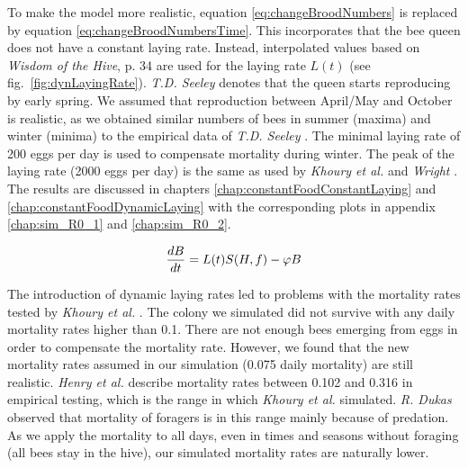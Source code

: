 		To make the model more realistic, equation \ref{eq:changeBroodNumbers} is replaced by equation \ref{eq:changeBroodNumbersTime}. This incorporates that the bee queen does not have a constant laying rate. Instead, interpolated values based on \textit{Wisdom of the Hive}, p. 34 \cite{seeley95} are used for the laying rate $L(t)$ (see fig.~\ref{fig:dynLayingRate}). \textit{T.D. Seeley} denotes that the queen starts reproducing by early spring. We assumed that reproduction between April/May and October is realistic, as we obtained similar numbers of bees in summer (maxima) and winter (minima) to the empirical data of \textit{T.D. Seeley} \cite{seeley95}. The minimal laying rate of 200 eggs per day is used to compensate mortality during winter. The peak of the laying rate (2000 eggs per day) is the same as used by \textit{Khoury et al.} \cite{khoury13} and \textit{Wright} \cite{wright08}. The results are discussed in chapters \ref{chap:constantFoodConstantLaying} and \ref{chap:constantFoodDynamicLaying} with the corresponding plots in appendix \ref{chap:sim_R0_1} and \ref{chap:sim_R0_2}.
		
		\begin{equation}\label{eq:changeBroodNumbersTime}
			{dB \over dt} = L(t)S(H,f)-\phi B
		\end{equation}
		
		The introduction of dynamic laying rates led to problems with the mortality rates tested by \textit{Khoury et al.} \cite{khoury13}. The colony we simulated did not survive with any daily mortality rates higher than 0.1. There are not enough bees emerging from eggs in order to compensate the mortality rate. However, we found that the new mortality rates assumed in our simulation (0.075 daily mortality) are still realistic. \textit{Henry et al.} \cite{henry12} describe mortality rates between 0.102 and 0.316 in empirical testing, which is the range in which \textit{Khoury et al.} \cite{khoury13} simulated. \textit{R. Dukas} \cite{dukas08} observed that mortality of foragers is in this range mainly because of predation. As we apply the mortality to all days, even in times and seasons without foraging (all bees stay in the hive), our simulated mortality rates are naturally lower.
	
